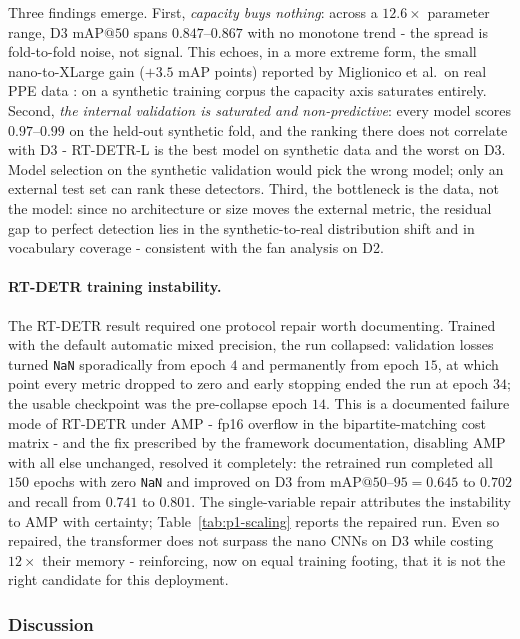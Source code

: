 Three findings emerge. First, \emph{capacity buys nothing}: across a
$12.6\times$ parameter range, D3 mAP$@50$ spans $0.847$--$0.867$ with no
monotone trend - the spread is fold-to-fold noise, not signal. This echoes, in
a more extreme form, the small nano-to-XLarge gain ($+3.5$ mAP points)
reported by Miglionico et al.\ on real PPE data \cite{Miglionico2025}: on a
synthetic training corpus the capacity axis saturates entirely. Second,
\emph{the internal validation is saturated and non-predictive}: every model
scores $0.97$--$0.99$ on the held-out synthetic fold, and the ranking there
does not correlate with D3 - RT-DETR-L is the best model on synthetic data and
the worst on D3. Model selection on the synthetic validation would pick the
wrong model; only an external test set can rank these detectors. Third, the
bottleneck is the data, not the model: since no architecture or size moves the
external metric, the residual gap to perfect detection lies in the
synthetic-to-real distribution shift and in vocabulary coverage - consistent
with the fan analysis on D2.

\paragraph{RT-DETR training instability.} The RT-DETR result required one
protocol repair worth documenting. Trained with the default automatic mixed
precision, the run collapsed: validation losses turned \texttt{NaN}
sporadically from epoch $4$ and permanently from epoch $15$, at which point
every metric dropped to zero and early stopping ended the run at epoch $34$;
the usable checkpoint was the pre-collapse epoch $14$. This is a documented
failure mode of RT-DETR under AMP - fp16 overflow in the bipartite-matching
cost matrix \cite{UltralyticsRTDETRTrainer} - and the fix prescribed by the
framework documentation, disabling AMP with all else unchanged, resolved it
completely: the retrained run completed all $150$ epochs with zero \texttt{NaN}
and improved on D3 from mAP$@50$--$95 = 0.645$ to $0.702$ and recall from
$0.741$ to $0.801$. The single-variable repair attributes the instability to
AMP with certainty; Table~\ref{tab:p1-scaling} reports the repaired run. Even
so repaired, the transformer does not surpass the nano CNNs on D3 while
costing $12\times$ their memory - reinforcing, now on equal training footing,
that it is not the right candidate for this deployment.

\subsubsection{Discussion}

